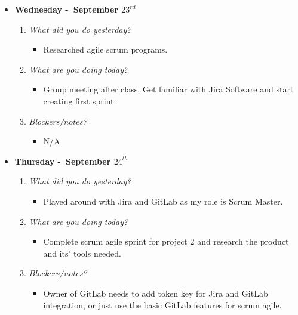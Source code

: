 \begin{itemize}
  \item[] \textbf{\large Wednesday -\ September \(23^{rd}\)}
  \begin{enumerate}
    \item \textsl{What did you do yesterday?}
    \begin{itemize}
      \item Researched agile scrum programs.
    \end{itemize}
    \item \textsl{What are you doing today?}
    \begin{itemize}
      \item Group meeting after class. Get familiar with Jira Software and start creating first sprint.
    \end{itemize}
    \item \textsl{Blockers/notes?}
    \begin{itemize}
      \item N/A
    \end{itemize}
  \end{enumerate}
\end{itemize}
\textbf{}
\begin{itemize}
  \item[] \textbf{\large Thursday -\ September \(24^{th}\)}
  \begin{enumerate}
    \item \textsl{What did you do yesterday?}
    \begin{itemize}
      \item Played around with Jira and GitLab as my role is Scrum Master.
    \end{itemize}
    \item \textsl{What are you doing today?}
    \begin{itemize}
      \item Complete scrum agile sprint for project 2 and research the product and its' tools needed. 
    \end{itemize}
    \item \textsl{Blockers/notes?}
    \begin{itemize}
      \item Owner of GitLab needs to add token key for Jira and GitLab integration, or just use the basic GitLab features for scrum agile.
    \end{itemize}
  \end{enumerate}
\end{itemize}
\textbf{}
